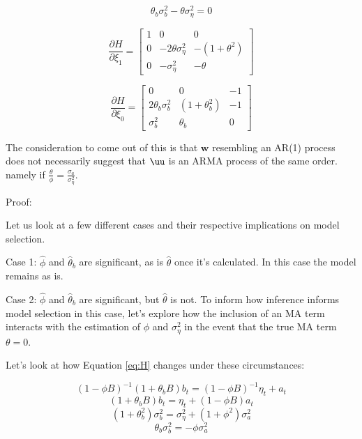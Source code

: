 $$ \theta_b\sigma_b^2 - \theta\sigma_\eta^2 = 0 $$

$$ \frac{\partial H}{\partial \xi_1} = \left[\begin{array}{ccc}
    1 & 0 & 0 \\
    0 & -2\theta\sigma_\eta^2 & -(1 + \theta^2) \\
    0 & -\sigma_\eta^2 & -\theta
\end{array}\right] $$

$$ \frac{\partial H}{\partial \xi_0} = \left[\begin{array}{ccc}
    0 & 0 & -1 \\
    2\theta_b\sigma_b^2 & (1 + \theta_b^2) & -1 \\
    \sigma_b^2 & \theta_b & 0
\end{array}\right] $$


The consideration to come out of this is that $\mathbf{w}$ resembling an AR(1) process does not necessarily suggest that $\uu$ is an ARMA process of the same order. namely if $\frac{\theta}{\phi} = \frac{\sigma_a}{\sigma_\eta^2}$. 

Proof:

Let us look at a few different cases and their respective implications on model selection.

Case 1: $\hat{\phi}$ and $\hat{\theta}_b$ are significant, as is $\hat{\theta}$ once it's calculated. In this case the model remains as is.

Case 2: $\hat{\phi}$ and $\hat{\theta}_b$ are significant, but $\hat{\theta}$ is not. To inform how inference informs model selection in this case, let's explore how the inclusion of an MA term interacts with the estimation of $\phi$ and $\sigma_\eta^2$ in the event that the true MA term $\theta = 0$.

Let's look at how Equation \ref{eq:H} changes under these circumstances:

\begin{equation}
    \label{eq:w-y-a_notheta}
    (1 - \phi B)^{-1}(1 + \theta_bB)b_t = (1-\phi B)^{-1}\eta_t + a_t 
\end{equation}
\begin{equation}
    \label{eq:w-y-a_notheta2}
    (1 + \theta_bB)b_t = \eta_t + (1 - \phi B)a_t 
\end{equation}
\begin{equation}
    \label{eq:H_notheta1}
    (1 + \theta_b^2)\sigma_b^2 = \sigma_\eta^2 + (1 + \phi^2)\sigma_a^2 
\end{equation}
\begin{equation}
    \label{eq:H_notheta1}
    \theta_b\sigma_b^2 = -\phi\sigma_a^2 
\end{equation}

